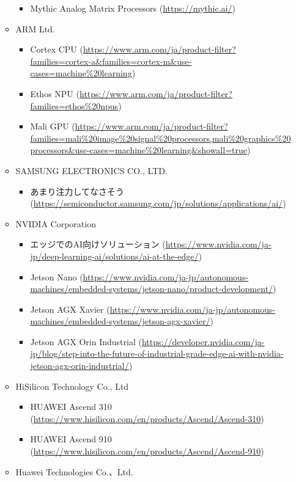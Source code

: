 \begin{itemize}
\begin{itemize}
		\begin{itemize}
			\item Mythic Analog Matrix Processors (\url{https://mythic.ai/})
		\end{itemize}
		\item ARM Ltd.
		\begin{itemize}
			\item Cortex CPU (\url{https://www.arm.com/ja/product-filter?families=cortex-a&families=cortex-m&use-cases=machine%20learning})
			\item Ethos NPU (\url{https://www.arm.com/ja/product-filter?families=ethos%20npus})
			\item Mali GPU (\url{https://www.arm.com/ja/product-filter?families=mali%20image%20signal%20processors,mali%20graphics%20processors&use-cases=machine%20learning&showall=true})
		\end{itemize}
		\item SAMSUNG ELECTRONICS CO., LTD.
		\begin{itemize}
			\item あまり注力してなさそう (\url{https://semiconductor.samsung.com/jp/solutions/applications/ai/})
		\end{itemize}
		\item NVIDIA Corporation
		\begin{itemize}
			\item エッジでのAI向けソリューション (\url{https://www.nvidia.com/ja-jp/deep-learning-ai/solutions/ai-at-the-edge/})
			\item Jetson Nano (\url{https://www.nvidia.com/ja-jp/autonomous-machines/embedded-systems/jetson-nano/product-development/})
			\item Jetson AGX Xavier (\url{https://www.nvidia.com/ja-jp/autonomous-machines/embedded-systems/jetson-agx-xavier/})
			\item Jetson AGX Orin Industrial (\url{https://developer.nvidia.com/ja-jp/blog/step-into-the-future-of-industrial-grade-edge-ai-with-nvidia-jetson-agx-orin-industrial/})
		\end{itemize}
		\item HiSilicon Technology Co., Ltd
		\begin{itemize}
			\item HUAWEI Ascend 310 (\url{https://www.hisilicon.com/en/products/Ascend/Ascend-310})
			\item HUAWEI Ascend 910 (\url{https://www.hisilicon.com/en/products/Ascend/Ascend-910})
		\end{itemize}
		\item Huawei Technologies Co.、Ltd.

\end{itemize}
\end{itemize}
